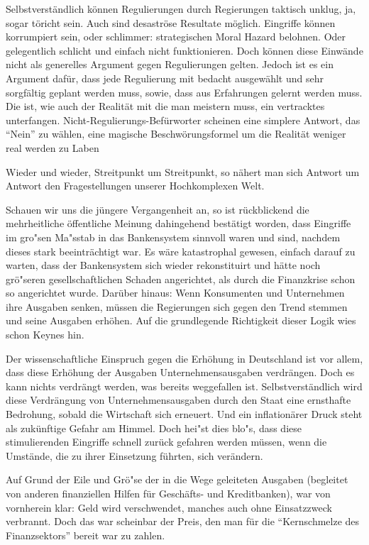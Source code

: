 \documentclass[
        onecolumn,
        a4paper,
        abstracton,
        parskip=half
        ,final
        ]{scrartcl}
\begin{document}
Selbstverst{\"a}ndlich k{\"o}nnen Regulierungen durch Regierungen taktisch unklug, ja, sogar t{\"o}richt sein. Auch sind desastr{\"o}se Resultate m{\"o}glich. Eingriffe k{\"o}nnen korrumpiert sein, oder schlimmer: strategischen Moral Hazard belohnen. Oder gelegentlich schlicht und einfach nicht funktionieren. Doch k{\"o}nnen diese Einw{\"a}nde nicht als generelles Argument gegen Regulierungen gelten. Jedoch ist es ein Argument daf{\"u}r, dass jede Regulierung mit bedacht ausgew{\"a}hlt und sehr sorgf{\"a}ltig geplant werden muss, sowie, dass aus Erfahrungen gelernt werden muss. Die ist, wie auch der Realit{\"a}t mit die man meistern muss, ein vertracktes unterfangen. Nicht-Regulierungs-Bef{\"u}rworter scheinen eine simplere Antwort, das "`Nein"' zu w{\"a}hlen, eine magische Beschw{\"o}rungsformel um die Realit{\"a}t weniger real werden zu Laben

Wieder und wieder, Streitpunkt um Streitpunkt, so n{\"a}hert man sich Antwort um Antwort den Fragestellungen unserer Hochkomplexen Welt.

Schauen wir uns die j{\"u}ngere Vergangenheit an, so ist r{\"u}ckblickend die mehrheitliche {\"o}ffentliche Meinung dahingehend best{\"a}tigt worden, dass Eingriffe im gro{"s}en Ma{"s}stab in das Bankensystem sinnvoll waren und sind, nachdem dieses stark beeintr{\"a}chtigt war. Es w{\"a}re katastrophal gewesen, einfach darauf zu warten, dass der Bankensystem sich wieder rekonstituirt und h{\"a}tte noch gr{\"o}{"s}eren gesellschaftlichen Schaden angerichtet, als durch die Finanzkrise schon so angerichtet wurde. Dar{\"u}ber hinaus: Wenn Konsumenten und Unternehmen ihre Ausgaben senken, m{\"u}ssen die Regierungen sich gegen den Trend stemmen und seine Ausgaben erh{\"o}hen. Auf die grundlegende Richtigkeit dieser Logik wies schon Keynes hin.

Der wissenschaftliche Einspruch gegen die Erh{\"o}hung in Deutschland ist vor allem, dass diese Erh{\"o}hung der Ausgaben Unternehmensausgaben verdr{\"a}ngen. Doch es kann nichts verdr{\"a}ngt werden, was bereits weggefallen ist. Selbstverst{\"a}ndlich wird diese Verdr{\"a}ngung von Unternehmensausgaben durch den Staat eine ernsthafte Bedrohung, sobald die Wirtschaft sich erneuert. Und ein inflation{\"a}rer Druck steht als zuk{\"u}nftige Gefahr am Himmel. Doch hei{"s}t dies blo{"s}, dass diese stimulierenden Eingriffe schnell zur{\"u}ck gefahren werden m{\"u}ssen, wenn die Umst{\"a}nde, die zu ihrer Einsetzung f{\"u}hrten, sich ver{\"a}ndern.

Auf Grund der Eile und Gr{\"o}{"s}e der in die Wege geleiteten Ausgaben (begleitet von anderen finanziellen Hilfen f{\"u}r Gesch{\"a}fts- und Kreditbanken), war von vornherein klar: Geld wird verschwendet, manches auch ohne Einsatzzweck verbrannt. Doch das war scheinbar der Preis, den man f{\"u}r die "`Kernschmelze des Finanzsektors"' bereit war zu zahlen.
\end{document}
